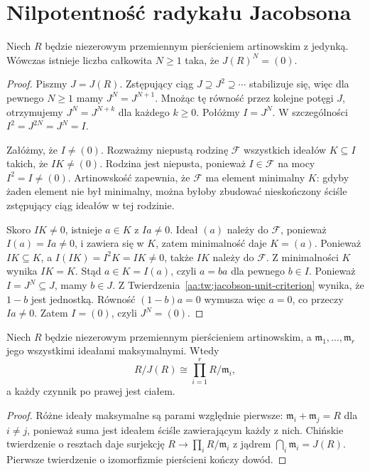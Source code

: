 \section{Nilpotentność radykału Jacobsona}
\begin{twierdzenie}
\label{aa:tw:artin-jacobson-nilpotent}
Niech $R$ będzie niezerowym przemiennym pierścieniem
artinowskim z jedynką. Wówczas istnieje liczba
całkowita $N\ge1$ taka, że $J(R)^N=(0)$.
\end{twierdzenie}
\begin{proof}
Piszmy $J=J(R)$. Zstępujący ciąg
$J\supseteq J^2\supseteq\cdots$ stabilizuje się,
więc dla pewnego $N\ge1$ mamy
$J^N=J^{N+1}$. Mnożąc tę równość przez kolejne
potęgi $J$, otrzymujemy $J^N=J^{N+k}$ dla każdego
$k\ge0$. Połóżmy $I=J^N$. W szczególności
$I^2=J^{2N}=J^N=I$.

Załóżmy, że $I\ne(0)$. Rozważmy niepustą rodzinę
$\mathcal F$ wszystkich ideałów $K\subseteq I$
takich, że $IK\ne(0)$. Rodzina jest niepusta, ponieważ
$I\in\mathcal F$ na mocy $I^2=I\ne(0)$.
Artinowskość zapewnia, że $\mathcal F$ ma element
minimalny $K$: gdyby żaden element nie był minimalny,
można byłoby zbudować nieskończony ściśle zstępujący
ciąg ideałów w tej rodzinie.

Skoro $IK\ne0$, istnieje $a\in K$ z $Ia\ne0$.
Ideał $(a)$ należy do $\mathcal F$, ponieważ
$I(a)=Ia\ne0$, i zawiera się w $K$, zatem
minimalność daje $K=(a)$.
Ponieważ $IK\subseteq K$, a
$I(IK)=I^2K=IK\ne0$, także $IK$ należy do
$\mathcal F$. Z minimalności $K$ wynika $IK=K$.
Stąd $a\in K=I(a)$, czyli $a=ba$ dla pewnego
$b\in I$. Ponieważ $I=J^N\subseteq J$, mamy
$b\in J$. Z
Twierdzenia~\ref{aa:tw:jacobson-unit-criterion}
wynika, że $1-b$ jest jednostką.
Równość $(1-b)a=0$ wymusza więc $a=0$, co przeczy
$Ia\ne0$. Zatem $I=(0)$, czyli $J^N=(0)$.
\end{proof}

\begin{wniosek}
\label{aa:wn:artin-semisimple-quotient}
Niech $R$ będzie niezerowym przemiennym pierścieniem
artinowskim, a $\mathfrak m_1,\ldots,\mathfrak m_r$
jego wszystkimi ideałami maksymalnymi. Wtedy
\[
 R/J(R)\cong\prod_{i=1}^r R/\mathfrak m_i,
\]
a każdy czynnik po prawej jest ciałem.
\end{wniosek}
\begin{proof}
Różne ideały maksymalne są parami względnie pierwsze:
$\mathfrak m_i+\mathfrak m_j=R$ dla $i\ne j$, ponieważ
suma jest ideałem ściśle zawierającym każdy z nich.
Chińskie twierdzenie o resztach daje surjekcję
$R\to\prod_i R/\mathfrak m_i$ z jądrem
$\bigcap_i\mathfrak m_i=J(R)$. Pierwsze twierdzenie
o izomorfizmie pierścieni kończy dowód.
\end{proof}

